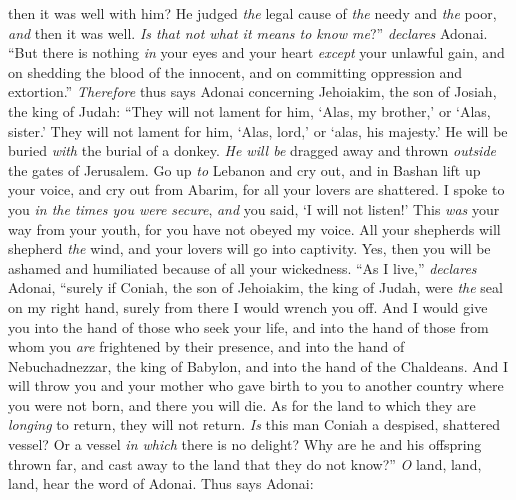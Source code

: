 \begin{biblechapter}
then it was well with him?
\verse He judged \textit{the} legal cause of \textit{the} needy and \textit{the} poor, 
\textit{and} then it was well. 
\textit{Is that not what it means to know me}?” \textit{declares} Adonai.
\verse “But there is nothing \textit{in} your eyes and your heart 
\textit{except} your unlawful gain, 
and on shedding the blood of the innocent, 
and on committing oppression and extortion.”
\verse \textit{Therefore} thus says Adonai concerning Jehoiakim, the son of Josiah, the king of Judah:
\verse “They will not lament for him, 
‘Alas, my brother,’ or ‘Alas, sister.’ 
They will not lament for him, 
‘Alas, lord,’ or ‘alas, his majesty.’
\verse He will be buried \textit{with} the burial of a donkey. 
\textit{He will be} dragged away and thrown \textit{outside} the gates of Jerusalem.
\verse Go up \textit{to} Lebanon and cry out, 
and in Bashan lift up your voice, 
and cry out from Abarim, 
for all your lovers are shattered.
\verse I spoke to you \textit{in the times you were secure}, 
\textit{and} you said, ‘I will not listen!’ 
This \textit{was} your way from your youth, 
for you have not obeyed my voice.
\verse All your shepherds will shepherd \textit{the} wind, 
and your lovers will go into captivity. 
Yes, then you will be ashamed and humiliated 
because of all your wickedness.
\verse “As I live,” \textit{declares} Adonai, “surely if Coniah, the son of Jehoiakim, the king of Judah, were \textit{the} seal on my right hand, surely from there I would wrench you off.
\verse And I would give you into the hand of those who seek your life, and into the hand of those from whom you \textit{are} frightened by their presence, and into the hand of Nebuchadnezzar, the king of Babylon, and into the hand of the Chaldeans.
\verse And I will throw you and your mother who gave birth to you to another country where you were not born, and there you will die.
\verse As for the land to which they are \textit{longing} to return, they will not return.
\verse \textit{Is} this man Coniah a despised, shattered vessel? 
Or a vessel \textit{in which} there is no delight? 
Why are he and his offspring thrown far, 
and cast away to the land that they do not know?”
\verse \textit{O} land, land, land, hear the word of Adonai.
\verse Thus says Adonai:
\end{biblechapter}

